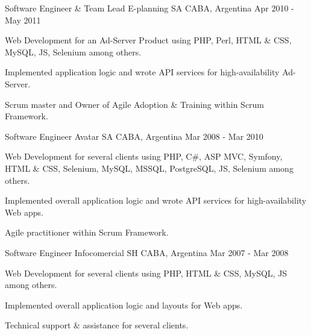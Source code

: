 \begin{cventries}
  \cventry
    {Software Engineer \& Team Lead}
    {E-planning SA}
    {CABA, Argentina}
    {Apr 2010 - May 2011}
    {
      \begin{cvitems}
        \item {Web Development for an Ad-Server Product using PHP, Perl, HTML \& CSS, MySQL, JS, Selenium among others.}
        \item {Implemented application logic and wrote API services for high-availability Ad-Server.}
        \item {Scrum master and Owner of Agile Adoption \& Training within Scrum Framework.}
      \end{cvitems}
    } 
   
  \cventry
    {Software Engineer}
    {Avatar SA}
    {CABA, Argentina}
    {Mar 2008 - Mar 2010}
    {
      \begin{cvitems}
        \item {Web Development for several clients using PHP, C\#, ASP MVC, Symfony, HTML \& CSS, Selenium, MySQL, MSSQL, PostgreSQL, JS, Selenium among others.}
        \item {Implemented overall application logic and wrote API services for high-availability Web apps.}
        \item {Agile practitioner within Scrum Framework.}
      \end{cvitems}
    } 
      
  \cventry
    {Software Engineer}
    {Infocomercial SH}
    {CABA, Argentina}
    {Mar 2007 - Mar 2008}
    {
      \begin{cvitems}
        \item {Web Development for several clients using PHP, HTML \& CSS, MySQL, JS among others.}
        \item {Implemented overall application logic and layouts for Web apps.}
        \item {Technical support \& assistance for several clients.}
      \end{cvitems}
    }  
\end{cventries}
